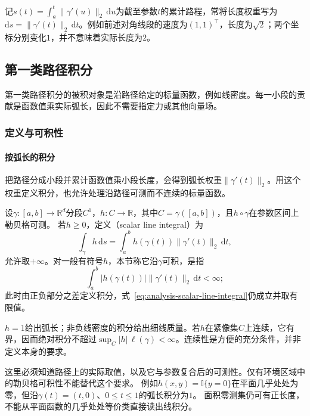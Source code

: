 记$s(t)=\int_a^t\lVert\gamma'(u)\rVert_2\,\mathrm du$为截至参数$t$的累计路程，常将长度权重写为
$\mathrm ds=\lVert\gamma'(t)\rVert_2\,\mathrm dt$。例如前述对角线段的速度为$(1,1)^\top$，长度为$\sqrt2$；两个坐标分别变化$1$，并不意味着实际长度为$2$。

\subsection{第一类路径积分}

第一类路径积分的被积对象是沿路径给定的标量函数，例如线密度。每一小段的贡献是函数值乘实际弧长，因此不需要指定力或其他向量场。

\subsubsection{定义与可积性}

\paragraph{按弧长的积分}

把路径分成小段并累计函数值乘小段长度，会得到弧长权重$\lVert\gamma'(t)\rVert_2$。用这个权重定义积分，也允许处理沿路径可测而不连续的标量函数。
\begin{definition}[第一类路径积分]
设$\gamma:[a,b]\to\mathbb R^d$分段$C^1$，$h:C\to\mathbb R$，其中$C=\gamma([a,b])$，且$h\circ\gamma$在参数区间上勒贝格可测。
若$h\geq0$，定义（scalar line integral）为
\begin{equation}
 \int_\gamma h\,\mathrm ds
 =\int_a^b h(\gamma(t))\lVert\gamma'(t)\rVert_2\,\mathrm dt,
 \label{eq:analysis-scalar-line-integral}
\end{equation}
允许取$+\infty$。对一般有符号$h$，本节称它沿$\gamma$可积，是指
\[
 \int_a^b |h(\gamma(t))|\lVert\gamma'(t)\rVert_2\,\mathrm dt<\infty;
\]
此时由正负部分之差定义积分，式~\eqref{eq:analysis-scalar-line-integral}仍成立并取有限值。
\end{definition}

$h=1$给出弧长；非负线密度的积分给出细线质量。若$h$在紧像集$C$上连续，它有界，因而绝对积分不超过$\sup_C|h|\,\ell(\gamma)<\infty$。连续性是方便的充分条件，并非定义本身的要求。

这里必须知道路径上的实际取值，以及它与参数复合后的可测性。仅有环境区域中的勒贝格可积性不能替代这个要求。
例如$h(x,y)=\mathbb I\{y=0\}$在平面几乎处处为零，但沿$\gamma(t)=(t,0)$、$0\leq t\leq1$的弧长积分为$1$。
面积零测集仍可有正长度，不能从平面函数的几乎处处等价类直接读出线积分。

